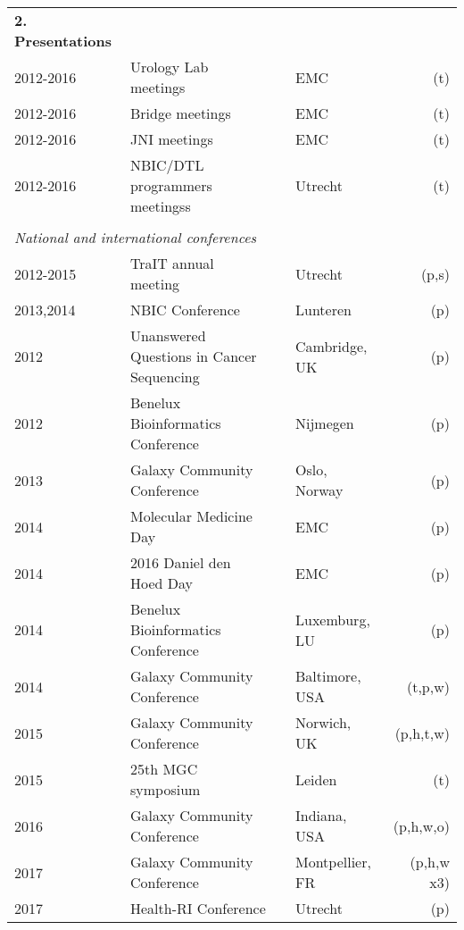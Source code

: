 \begin{table}[h!]
    \begin{tabular}{llp{0.5cm}lr}
        \textbf{2. Presentations} \\
        2012-2016 & Urology Lab meetings              && EMC         & (t) \\
        2012-2016 & Bridge meetings                   && EMC         & (t) \\
        2012-2016 & JNI meetings                      && EMC         & (t) \\
        2012-2016 & NBIC/DTL programmers meetingss    && Utrecht     & (t) \\
        \\
        \multicolumn{4}{l}{\textit{National and international conferences}} \\
        2012-2015 & TraIT annual meeting                   && Utrecht         & (p,s) \\
        2013,2014 & NBIC Conference                        && Lunteren        & (p) \\
        2012 & Unanswered Questions in Cancer Sequencing   && Cambridge, UK   & (p) \\
        2012 & Benelux Bioinformatics Conference           && Nijmegen        & (p) \\
        2013 & Galaxy Community Conference                 && Oslo, Norway    & (p) \\
        2014 & Molecular Medicine Day                      && EMC             & (p) \\
        2014 & 2016 Daniel den Hoed Day                    && EMC             & (p) \\
        2014 & Benelux Bioinformatics Conference           && Luxemburg, LU   & (p) \\
        2014 & Galaxy Community Conference                 && Baltimore, USA  & (t,p,w) \\
        2015 & Galaxy Community Conference                 && Norwich, UK     & (p,h,t,w) \\
        2015 & 25th MGC symposium                          && Leiden          & (t) \\
        2016 & Galaxy Community Conference                 && Indiana, USA    & (p,h,w,o) \\
        2017 & Galaxy Community Conference                 && Montpellier, FR & (p,h,w x3) \\
        2017 & Health-RI Conference                        && Utrecht         & (p) \\

\end{tabular}
\end{table}
